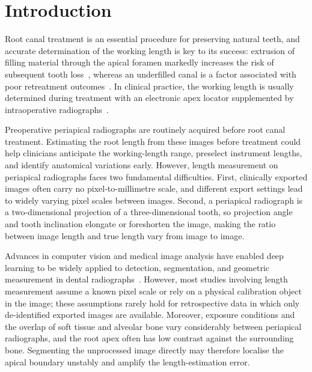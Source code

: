 \section{Introduction}

Root canal treatment is an essential procedure for preserving natural teeth, and accurate determination of the working length is key to its success: extrusion of filling material through the apical foramen markedly increases the risk of subsequent tooth loss~\cite{Ng2011}, whereas an underfilled canal is a factor associated with poor retreatment outcomes~\cite{Sabeti2024}. In clinical practice, the working length is usually determined during treatment with an electronic apex locator supplemented by intraoperative radiographs~\cite{Kaur2024}.

Preoperative periapical radiographs are routinely acquired before root canal treatment. Estimating the root length from these images before treatment could help clinicians anticipate the working-length range, preselect instrument lengths, and identify anatomical variations early. However, length measurement on periapical radiographs faces two fundamental difficulties. First, clinically exported images often carry no pixel-to-millimetre scale, and different export settings lead to widely varying pixel scales between images. Second, a periapical radiograph is a two-dimensional projection of a three-dimensional tooth, so projection angle and tooth inclination elongate or foreshorten the image, making the ratio between image length and true length vary from image to image.

Advances in computer vision and medical image analysis have enabled deep learning to be widely applied to detection, segmentation, and geometric measurement in dental radiographs~\cite{Aminoshariae2021,Fontenele2025}. However, most studies involving length measurement assume a known pixel scale or rely on a physical calibration object in the image; these assumptions rarely hold for retrospective data in which only de-identified exported images are available. Moreover, exposure conditions and the overlap of soft tissue and alveolar bone vary considerably between periapical radiographs, and the root apex often has low contrast against the surrounding bone. Segmenting the unprocessed image directly may therefore localise the apical boundary unstably and amplify the length-estimation error.

